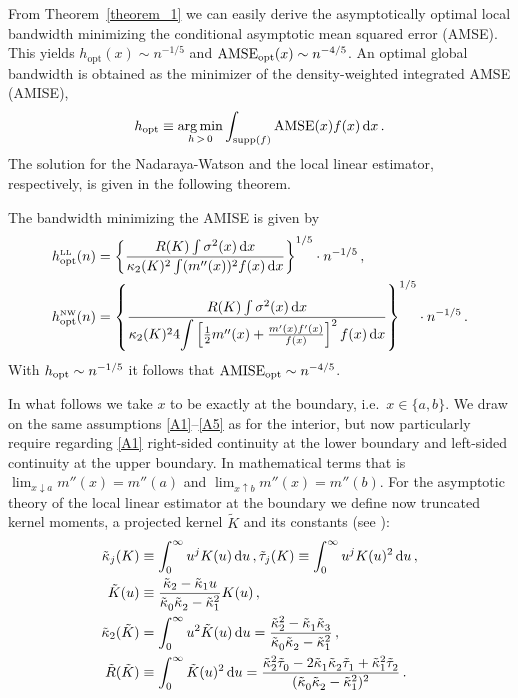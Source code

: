 From Theorem~\ref{theorem_1} we can easily derive the asymptotically optimal local bandwidth minimizing the conditional asymptotic mean squared error (AMSE).
This yields $h_{\text{opt}}(x) \sim n^{-1/5}$ and $\operatorname{AMSE}_{\text{opt}}(x) \sim n^{-4/5}$.
An optimal global bandwidth is obtained as the minimizer of the density-weighted integrated AMSE (AMISE),
\begin{equation}
	h_{\text{opt}} \equiv \operatorname*{arg\,min}_{h \,>\, 0} \int_{\operatorname{supp}(f)}^{} \operatorname{AMSE}(x) f(x) \mathop{}\!\textup{d} x \,.
\end{equation} 
The solution for the Nadaraya-Watson and the local linear estimator, respectively, is given in the following theorem.
\begin{theorem} \label{theorem_2}
	The bandwidth minimizing the AMISE is given by
	\begin{align}
		h_{\textup{opt}}^{\LL}(n) &= \left\{ \frac{R(K) \int \sigma^2(x) \diff x}{\kappa_2(K)^2 \int (m''(x))^2 f(x) \diff x} \right\}^{1/5} \cdot n^{-1/5} \,, \\
		h_{\textup{opt}}^{\NW}(n) &= \left\{ \frac{R(K) \int \sigma^2(x) \diff x}{\kappa_2(K)^2 4 \mathlarger{\int} \left[ \frac{1}{2} m''(x) + \frac{m'(x) f'(x)}{f(x)} \right]^2 f(x) \diff x} \right\}^{1/5} \cdot n^{-1/5} \,.
	\end{align}
	With $h_{\textup{opt}} \sim n^{-1/5}$ it follows that $\operatorname{AMISE}_{\textup{opt}} \sim n^{-4/5}$. 
\end{theorem}     

In what follows we take $x$ to be exactly at the boundary, i.e.\ $x \in \{a, b\}$.
We draw on the same assumptions \ref{A1}--\ref{A5} as for the interior,
but now particularly require regarding \ref{A1} right-sided continuity at the lower boundary and left-sided continuity at the upper boundary.
In mathematical terms that is $\lim_{x \downarrow a} m''(x) = m''(a)$ and $\lim_{x \uparrow b} m''(x) = m''(b)$.
For the asymptotic theory of the local linear estimator at the boundary we define now truncated kernel moments, a projected kernel $\tilde{K}$ and its constants (see \cite[684]{Hansen_2022}):
\begin{align}
	\tilde{\kappa}_j(K) &\equiv \int_{0}^{\infty} u^jK(u) \mathop{}\!\textup{d} u \,, \tilde{\tau}_j(K) \equiv \int_{0}^{\infty} u^jK(u)^2 \mathop{}\!\textup{d} u \,, \\
	\tilde{K}(u) &\equiv \frac{\tilde{\kappa}_2 - \tilde{\kappa}_1 u}{\tilde{\kappa}_0^{\vphantom{2}} \tilde{\kappa}_2^{\vphantom{2}} - \tilde{\kappa}_1^2} K(u) \,, \\
	\tilde{\kappa}_2(\tilde{K}) &= \int_{0}^{\infty} u^2\tilde{K}(u) \mathop{}\!\textup{d} u = \frac{\tilde{\kappa}_2^2 - \tilde{\kappa}_1^{\vphantom{2}}  \tilde{\kappa}_3^{\vphantom{2}}}{\tilde{\kappa}_0^{\vphantom{2}} \tilde{\kappa}_2^{\vphantom{2}} - \tilde{\kappa}_1^2} \,, \\
	\tilde{R}(\tilde{K}) &\equiv \int_{0}^{\infty} \tilde{K}(u)^2 \mathop{}\!\textup{d} u = \frac{\tilde{\kappa}_2^2 \tilde{\tau}_0^{\vphantom{2}} - 2 \tilde{\kappa}_1^{\vphantom{2}} \tilde{\kappa}_2^{\vphantom{2}} \tilde{\tau}_1^{\vphantom{2}} + \tilde{\kappa}_1^2 \tilde{\tau}_2^{\vphantom{2}}}{(\tilde{\kappa}_0^{\vphantom{2}} \tilde{\kappa}_2^{\vphantom{2}} - \tilde{\kappa}_1^2)_{\vphantom{2}}^2} \,.
\end{align}

